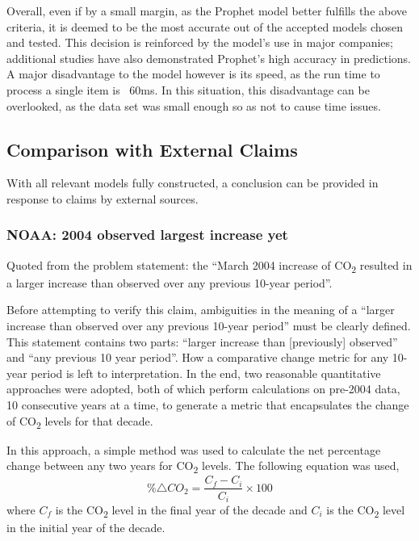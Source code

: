 \documentclass[12pt]{mcmthesis}
\newcommand{\size}[2]{{\fontsize{#1}{0}\selectfont#2}}
\begin{document}
    Overall, even if by a small margin, as the Prophet model better fulfills the above criteria, it is deemed to be the most accurate out of the accepted models chosen and tested. This decision is reinforced by the model’s use in major companies; additional studies have also demonstrated Prophet’s high accuracy in predictions. A major disadvantage to the model however is its speed, as the run time to process a single item is ~60ms. In this situation, this disadvantage can be overlooked, as the data set was small enough so as not to cause time issues.


    \subsection{Comparison with External Claims}

    With all relevant models fully constructed, a conclusion can be provided in response to claims by external sources.


    \subsubsection*{NOAA: 2004 observed largest increase yet}

    Quoted from the problem statement: the ``March 2004 increase of CO\textsubscript{2} resulted in a larger increase than observed over any previous 10-year period''.

    Before attempting to verify this claim, ambiguities in the meaning of a ``larger increase than observed over any previous 10-year period'' must be clearly defined.
    This statement contains two parts: ``larger increase than [previously] observed'' and ``any previous 10 year period''.
    How a comparative change metric for any 10-year period is left to interpretation.
    In the end, two reasonable quantitative approaches were adopted, both of which perform calculations on pre-2004 data, 10 consecutive years at a time, to generate a metric that encapsulates the change of CO\textsubscript{2} levels for that decade.


    \noindent\size{12}{\textbf{Comparing to decadal changes}}

    In this approach, a simple method was used to calculate the net percentage change between any two years for CO\textsubscript{2} levels. The following equation was used,
%
    \begin{equation}
        \displaystyle \% \triangle CO_2 = \frac{C_f - C_i}{C_i} \times 100
    \end{equation}
%
    where
    $C_f$ is the CO\textsubscript{2} level in the final year of the decade and
    $C_i$ is the CO\textsubscript{2} level in the initial year of the decade.
\end{document}
